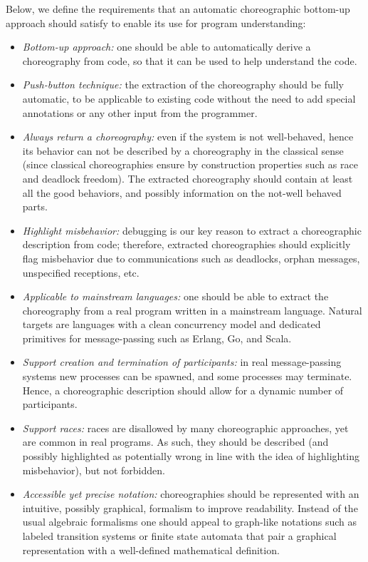 Below, we define the requirements that an automatic choreographic bottom-up approach should satisfy to enable its use for program understanding:
\begin{itemize}
    \item \textit{Bottom-up approach:} one should be able to automatically derive a choreography from code, so that it can be used  to help understand the code.
    \item \textit{Push-button technique:} the extraction of the choreography
    should be fully automatic, to be applicable to existing code
    without the need to add special annotations or any other input
    from the programmer.
    \item \textit{Always return a choreography:} even if the
         system is not well-behaved, hence its behavior can not be
         described by a choreography in the classical sense (since
         classical choreographies ensure by construction properties
         such as race and deadlock freedom). The extracted
         choreography should contain at least all the good behaviors,
         and possibly information on the not-well behaved parts.
    \item \textit{Highlight misbehavior:}
  debugging is our key reason to extract a choreographic description
  from code; therefore, extracted choreographies should explicitly flag
  misbehavior due to communications such as deadlocks, orphan
  messages, unspecified receptions, etc.
    \item \textit{Applicable to mainstream languages:} one should be able to
    extract the choreography from a real program written in a
    mainstream language. Natural targets are languages with a clean concurrency model and 		dedicated primitives for message-passing such as Erlang, Go, and Scala.
    \item \textit{Support creation and termination of participants:} in real
    message-passing systems new processes can be spawned, and some processes may
    terminate. Hence, a choreographic description should allow for
    a dynamic  number of participants.
    \item \textit{Support races:} races are disallowed by many choreographic
    approaches, yet are common in real programs. As such, they should
    be described (and possibly highlighted as potentially wrong in
    line with the idea of highlighting misbehavior), but not
    forbidden.
    \item \textit{Accessible yet precise notation:} choreographies
    should be represented with an intuitive, possibly
    graphical, formalism to improve readability. Instead of the usual algebraic
    formalisms one should appeal to graph-like notations such as
    labeled transition systems or finite state automata that pair a graphical representation with a
    well-defined  mathematical definition.
\end{itemize}